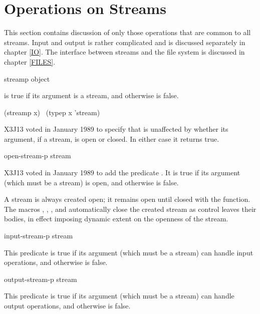\section {Operations on Streams}

This section contains discussion of only those operations that
are common to all streams.  Input and output is rather complicated
and is discussed separately in chapter \ref{IO}.
The interface between streams and the file system is discussed
in chapter \ref{FILES}.

\begin{defun}[Function]
streamp object

 is true if its argument is a stream,
and otherwise is false.
\begin{lisp}
(streamp x) \EQ\ (typep x 'stream)
\end{lisp}

\begin{new}
X3J13 voted in January 1989
to specify that  is unaffected
by whether its argument, if a stream, is open or closed.  In either case
it returns true.
\end{new}
\end{defun}

\begin{newer}
\begin{defun}[Function]
open-stream-p stream

X3J13 voted in January 1989 
to add the predicate .
It is true if its argument (which must be a stream)
is open, and otherwise is false.

A stream is always created open; it remains open until closed
with the  function.  The macros ,
, ,
and  automatically close the created stream
as control leaves their bodies, in effect imposing dynamic extent
on the openness of the stream.
\end{defun}
\end{newer}

\begin{defun}[Function]
input-stream-p stream

This predicate is true if its argument (which must be a stream) can handle
input operations, and otherwise is false.
\end{defun}

\begin{defun}[Function]
output-stream-p stream

This predicate is true if its argument (which must be a stream) can handle
output operations, and otherwise is false.
\end{defun}


